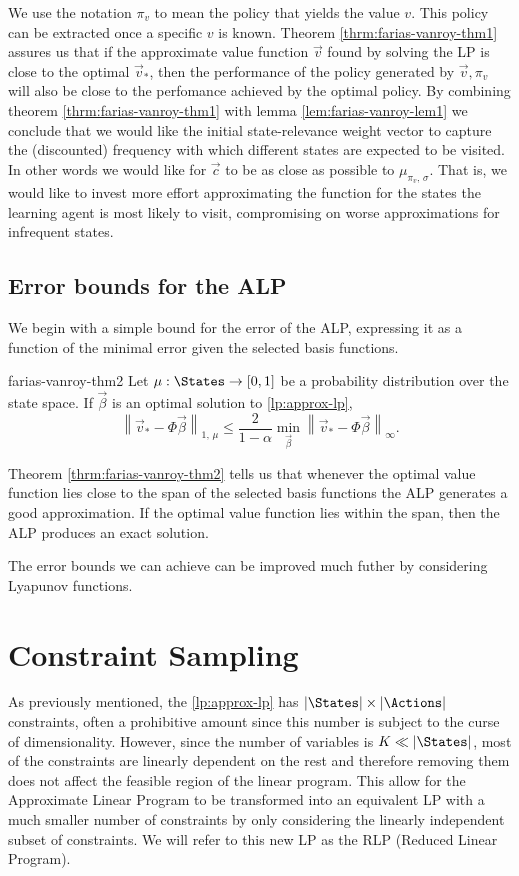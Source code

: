 We use the notation $\pi_v$ to mean the policy that yields the value $v$. This
policy can be extracted once a specific $v$ is known. Theorem
\ref{thrm:farias-vanroy-thm1} assures us that if the approximate value function
$\vec{v}$ found by solving the LP is close to the optimal $\vec{v}_{*}$, then
the performance of the policy generated by $\vec{v}, \pi_v$  will also be close
to the perfomance achieved by the optimal policy. By combining theorem
\ref{thrm:farias-vanroy-thm1} with lemma \ref{lem:farias-vanroy-lem1} we
conclude that we would like the initial state-relevance weight vector to capture
the (discounted) frequency with which different states are expected to be
visited. In other words we would like for $\vec{c}$ to be as close as possible
to $\mu_{\pi_v, \, \sigma}$. That is, we would like to invest more effort
approximating the function for the states the learning agent is most likely to
visit, compromising on worse approximations for infrequent states.

\subsection{Error bounds for the ALP}
We begin with a simple bound for the error of the ALP, expressing it as a
function of the minimal error given the selected basis functions.

\begin{thrm}{}{farias-vanroy-thm2}
    Let $\mu: \States \to [0,1]$ be a probability distribution over the state
    space. If $\vec{\beta}$ is an optimal solution to \eqref{lp:approx-lp},
    \[
        \left\| \vec{v}_* - \Phi \vec{\beta} \right\|_{1, \, \mu} \leq \frac{2}{1-\alpha} \min_{\vec{\beta}} \left\| \vec{v}_* - \Phi \vec{\beta} \right\|_{\infty}.
    \]
\end{thrm}

Theorem \ref{thrm:farias-vanroy-thm2} tells us that whenever the optimal value
function lies close to the span of the selected basis functions the ALP
generates a good approximation. If the optimal value function lies within the
span, then the ALP produces an exact solution.

The error bounds we can achieve can be improved much futher by considering Lyapunov functions.

\section{Constraint Sampling}

As previously mentioned, the \eqref{lp:approx-lp} has $|\States| \times
|\Actions|$ constraints, often a prohibitive amount since this number is subject
to the curse of dimensionality. However, since the number of variables is $K \ll
|\States|$, most of the constraints are linearly dependent on the rest and
therefore removing them does not affect the feasible region of the linear
program. This allow for the Approximate Linear Program to be transformed into an
equivalent LP with a much smaller number of constraints by only considering the
linearly independent subset of constraints. We will refer to this new LP as the
RLP (Reduced Linear Program).

